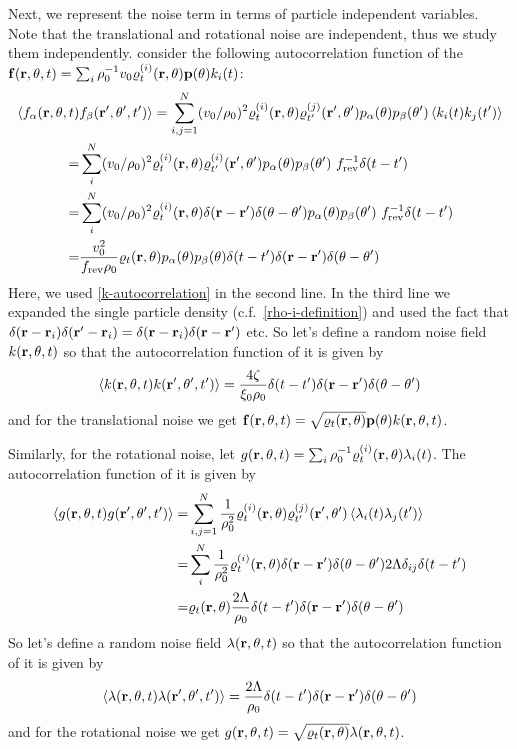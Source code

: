 \documentclass[a5paper]{article}
\begin{document}
Next, we represent the noise term in terms of particle independent variables. Note that the translational and rotational noise are independent, thus we study them independently.
consider the following autocorrelation function of the $\mathbf{f}(\mathbf{r}, \theta, t) = \sum_i \rho_0^{-1} v_0\varrho^{(i)}_t(\mathbf{r}, \theta) \mathbf{p}(\theta) k_i(t)$:
\begin{align}
    \langle f_\alpha(\mathbf{r}, \theta, t) &f_\beta(\mathbf{r}', \theta', t') \rangle = \sum_{i,j=1}^N (v_0/\rho_0)^2 \varrho^{(i)}_t(\mathbf{r}, \theta) \varrho^{(j)}_{t'}(\mathbf{r}', \theta') p_\alpha(\theta) p_\beta(\theta') \left\langle k_i(t) k_j(t') \right\rangle
    \\
    =& \sum_{i}^N (v_0/\rho_0)^2 \varrho^{(i)}_t(\mathbf{r}, \theta) \varrho^{(i)}_{t'}(\mathbf{r}', \theta') p_\alpha(\theta) p_\beta(\theta') ~f_{\rm rev}^{-1}\delta(t-t')
    \\
    =& \sum_{i}^N (v_0/\rho_0)^2 \varrho^{(i)}_t(\mathbf{r}, \theta) \delta(\mathbf{r}-\mathbf{r}') \delta(\theta-\theta') p_\alpha(\theta) p_\beta(\theta')~f_{\rm rev}^{-1}\delta(t-t')
    \\
    =& \frac{v_0^2}{f_{\rm rev} \rho_0} \varrho_t(\mathbf{r}, \theta) p_\alpha(\theta) p_\beta(\theta) \delta(t-t')\delta(\mathbf{r}-\mathbf{r}') \delta(\theta-\theta')
\end{align}
Here, we used \cref{k-autocorrelation} in the second line. In the third line we expanded the single particle density (c.f.~\cref{rho-i-definition}) and used the fact that $\delta(\mathbf{r} - \mathbf{r}_i)\delta(\mathbf{r}'-\mathbf{r}_i) = \delta(\mathbf{r} - \mathbf{r}_i)\delta(\mathbf{r} - \mathbf{r}')$ etc. 
So let's define a random noise field $k(\mathbf{r}, \theta, t)$ so that the autocorrelation function of it is given by
\begin{align}
    \left\langle k(\mathbf{r}, \theta, t) k(\mathbf{r}', \theta', t') \right\rangle = \frac{4\zeta}{\xi_0\rho_0} \delta(t-t') \delta(\mathbf{r}-\mathbf{r}') \delta(\theta-\theta')
\end{align}
and for the translational noise we get $\mathbf{f}(\mathbf{r}, \theta, t) = \sqrt{\varrho_t(\mathbf{r}, \theta)} \mathbf{p}(\theta) k(\mathbf{r}, \theta, t)$.

Similarly, for the rotational noise, let $g(\mathbf{r}, \theta, t) = \sum_i \rho_0^{-1}\varrho^{(i)}_t(\mathbf{r}, \theta) \lambda_i(t)$. The autocorrelation function of it is given by
\begin{align}
    \left\langle g(\mathbf{r}, \theta, t) g(\mathbf{r}', \theta', t') \right\rangle =& \sum_{i,j=1}^N \frac{1}{\rho_0^2}\varrho^{(i)}_t(\mathbf{r}, \theta) \varrho^{(j)}_{t'}(\mathbf{r}', \theta') \left\langle \lambda_i(t) \lambda_j(t') \right\rangle
    \\
    =& \sum_{i}^N \frac{1}{\rho_0^2}\varrho^{(i)}_t(\mathbf{r}, \theta) \delta(\mathbf{r}-\mathbf{r}') \delta(\theta-\theta') 2 \Lambda \delta_{ij} \delta(t-t')
    \\
    =& \varrho_t(\mathbf{r}, \theta) \frac{2 \Lambda}{\rho_0} \delta(t-t') \delta(\mathbf{r}-\mathbf{r}') \delta(\theta-\theta')
\end{align}
So let's define a random noise field $\lambda(\mathbf{r}, \theta, t)$ so that the autocorrelation function of it is given by
\begin{align}
    \left\langle \lambda(\mathbf{r}, \theta, t) \lambda(\mathbf{r}', \theta', t') \right\rangle = \frac{2 \Lambda}{\rho_0} \delta(t-t') \delta(\mathbf{r}-\mathbf{r}') \delta(\theta-\theta')
\end{align}
and for the rotational noise we get $g(\mathbf{r}, \theta, t) = \sqrt{\varrho_t(\mathbf{r}, \theta)} \lambda(\mathbf{r}, \theta, t)$.
\end{document}
